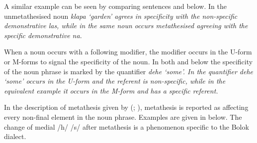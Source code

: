 A similar example can be seen by comparing
sentences  and  below.
In  the unmetathesised noun \it{klapa} `garden' agrees
in specificity with the non-specific demonstrative \it{las},
while in  the same noun occurs metathesised
agreeing with the specific demonstrative \it{na}.

\begin{exe}\let\eachwordone=\it
	\label{ex:NolKlapaLas}
	\label{ex:OenTamasLakos}
\end{exe}

When a noun occurs with a following modifier,
the modifier occurs in the U-form or M-forms
to signal the specificity of the noun.
In both  and  below
the specificity of the noun phrase is marked by the quantifier \it{dehe} `some'.
In  the quantifier \it{dehe} `some' occurs in the U-form
and the referent is non-specific,
while in the equivalent example  it occurs in the M-form
and has a specific referent.

\begin{exe}\let\eachwordone=\it
	\label{ex:KatBukuDehe}
	\label{ex:KatBukuDeeh}
\end{exe}

In the description of metathesis given by \citeauthor{st96b} (\citeyear{st96b}; \citeyear{st08}),
metathesis is reported as affecting every non-final element in the noun phrase.
Examples are given in  below.
The change of medial /h/ {\ra} /s/ after metathesis
is a phenomenon specific to the Bolok dialect.

